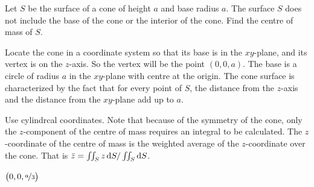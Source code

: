 \begin{question}[M317 2008D] %
Let $S$ be the surface of a cone of height $a$ and base radius $a$. 
The surface $S$ does not include the base of the cone or the interior 
of the cone. Find the centre of mass of $S$.

Locate the cone in a coordinate system so that its base is in the 
$xy$-plane, and its vertex is on the $z$-axis. So the vertex will 
be the point $(0, 0, a)$. The base is a circle of radius $a$ in the 
$xy$-plane with centre at the origin. The cone surface is characterized
by the fact that for every point of $S$, the distance from the $z$-axis 
and the distance from the $xy$-plane add up to $a$.

\end{question}

\begin{hint} 
Use cylindrcal coordinates. Note that because of the symmetry of the cone, 
only the $z$-component of the centre of mass requires an integral 
to be calculated. The $z$-coordinate of the centre of mass is 
the weighted average of the $z$-coordinate over the cone. That is
$\bar z =\iint_S z\,\mathrm{d}S/\iint_S\mathrm{d}S$.
\end{hint}

\begin{answer} 
$\big(0,0,\nicefrac{a}{3}\big)$
\end{answer}

